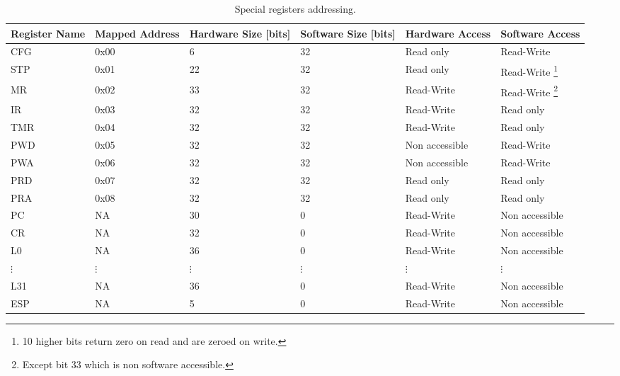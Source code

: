 \begin{table}
  \begin{center}
    \begin{tabu} to \textwidth {|X|X[c]|X[c]|X[c]|X|X|}
    \hline
    \rowfont[c]\bfseries
    Register Name & Mapped Address & Hardware Size [bits] & Software Size [bits] & Hardware Access & Software Access \\
    \hline
    \hline
    CFG      & 0x00     & 6        & 32       & Read only      & Read-Write     \\
    \hline
    STP      & 0x01     & 22       & 32       & Read only      & Read-Write     \footnote{10 higher bits return zero on read and are zeroed on write.} \\
    \hline
    MR       & 0x02     & 33       & 32       & Read-Write     & Read-Write     \footnote{Except bit 33 which is non software accessible.}\\
    \hline
    IR       & 0x03     & 32       & 32       & Read-Write     & Read only      \\
    \hline
    TMR      & 0x04     & 32       & 32       & Read-Write     & Read only      \\
    \hline
    PWD      & 0x05     & 32       & 32       & Non accessible & Read-Write     \\
    \hline
    PWA      & 0x06     & 32       & 32       & Non accessible & Read-Write     \\
    \hline
    PRD      & 0x07     & 32       & 32       & Read only      & Read only      \\
    \hline
    PRA      & 0x08     & 32       & 32       & Read only      & Read only      \\
    \hline
    PC       & NA       & 30       & 0        & Read-Write     & Non accessible \\
    \hline
    CR       & NA       & 32       & 0        & Read-Write     & Non accessible \\
    \hline
    L0       & NA       & 36       & 0        & Read-Write     & Non accessible \\
    \hline
    $\vdots$ & $\vdots$ & $\vdots$ & $\vdots$ & $\vdots$       & $\vdots$       \\
    \hline
    L31      & NA       & 36       & 0        & Read-Write     & Non accessible \\
    \hline
    ESP      & NA       & 5        & 0        & Read-Write     & Non accessible \\
    \hline
    \end{tabu}
  \caption{Special registers addressing.}
  \label{tbl:special_reg_addresses}
  \end{center}
\end{table}
